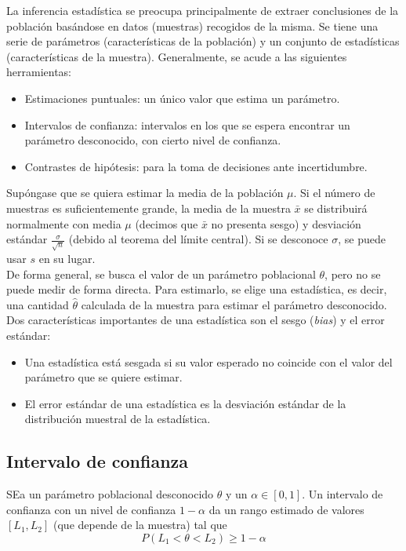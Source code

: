 La inferencia estadística se preocupa principalmente de extraer conclusiones de la población basándose en datos (muestras) recogidos de la misma. Se tiene una serie de parámetros (características de la población) y un conjunto de estadísticas (características de la muestra). Generalmente, se acude a las siguientes herramientas:
\begin{itemize}
\item Estimaciones puntuales: un único valor que estima un parámetro.
\item Intervalos de confianza: intervalos en los que se espera encontrar un parámetro desconocido, con cierto nivel de confianza.
\item Contrastes de hipótesis: para la toma de decisiones ante incertidumbre.
\end{itemize}

Supóngase que se quiera estimar la media de la población $\mu$. Si el número de muestras es suficientemente grande, la media de la muestra $\bar{x}$ se distribuirá normalmente con media $\mu$ (decimos que $\bar{x}$ no presenta sesgo) y desviación estándar $\frac{\sigma}{\sqrt{n}}$ (debido al teorema del límite central). Si se desconoce $\sigma$, se puede usar $s$ en su lugar. \\

De forma general, se busca el valor de un parámetro poblacional $\theta$, pero no se puede medir de forma directa. Para estimarlo, se elige una estadística, es decir, una cantidad $\hat{\theta}$ calculada de la muestra para estimar el parámetro desconocido. Dos características importantes de una estadística son el sesgo (\textit{bias}) y el error estándar:
\begin{itemize}
\item Una estadística está sesgada si su valor esperado no coincide con el valor del parámetro que se quiere estimar. 
\item El error estándar de una estadística es la desviación estándar de la distribución muestral de la estadística.
\end{itemize}

\subsection{Intervalo de confianza}

SEa un parámetro poblacional desconocido $\theta$ y un $\alpha \in [0, 1]$. Un intervalo de confianza con un nivel de confianza $1 - \alpha$ da un rango estimado de valores $[L_1, L_2]$ (que depende de la muestra) tal que 
\begin{equation}
P(L_1 < \theta < L_2) \geq 1 - \alpha  
\end{equation} 

